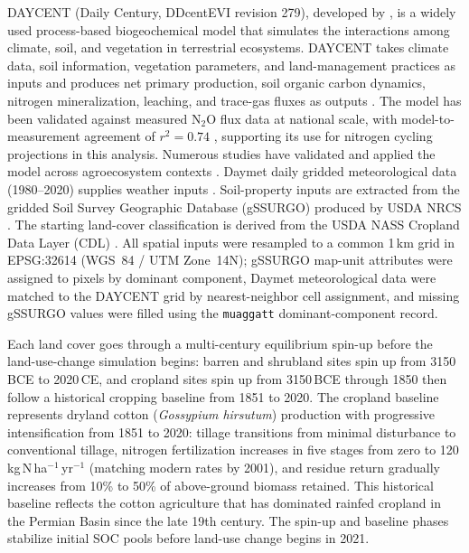 \documentclass[11pt]{article}
\begin{document}
DAYCENT (Daily Century, DDcentEVI revision 279), developed by \citet{Parton1998DAYCENT}, is a widely used process-based biogeochemical model that simulates the interactions among climate, soil, and vegetation in terrestrial ecosystems. DAYCENT takes climate data, soil information, vegetation parameters, and land-management practices as inputs and produces net primary production, soil organic carbon dynamics, nitrogen mineralization, leaching, and trace-gas fluxes as outputs \citep{Parton1998DAYCENT,DelGrosso2005Placeholder,DelGrosso2006NationalScale}. The model has been validated against measured N$_2$O flux data at national scale, with model-to-measurement agreement of $r^2 = 0.74$ \citep{DelGrosso2005Placeholder}, supporting its use for nitrogen cycling projections in this analysis. Numerous studies have validated and applied the model across agroecosystem contexts \citep{Davis2010Comparative,Jarecki2020Placeholder,Laub2024Placeholder}. Daymet daily gridded meteorological data (1980--2020) supplies weather inputs \citep{Thornton2022Daymet}. Soil-property inputs are extracted from the gridded Soil Survey Geographic Database (gSSURGO) produced by USDA NRCS \citep{NRCSgSSURGOPlaceholder}. The starting land-cover classification is derived from the USDA NASS Cropland Data Layer (CDL) \citep{NASCDLPlaceholder}. All spatial inputs were resampled to a common 1\,km grid in EPSG:32614 (WGS~84 / UTM Zone~14N); gSSURGO map-unit attributes were assigned to pixels by dominant component, Daymet meteorological data were matched to the DAYCENT grid by nearest-neighbor cell assignment, and missing gSSURGO values were filled using the \texttt{muaggatt} dominant-component record.

Each land cover goes through a multi-century equilibrium spin-up before the land-use-change simulation begins: barren and shrubland sites spin up from 3150\,BCE to 2020\,CE, and cropland sites spin up from 3150\,BCE through 1850 then follow a historical cropping baseline from 1851 to 2020. The cropland baseline represents dryland cotton (\textit{Gossypium hirsutum}) production with progressive intensification from 1851 to 2020: tillage transitions from minimal disturbance to conventional tillage, nitrogen fertilization increases in five stages from zero to 120\,kg\,N\,ha$^{-1}$\,yr$^{-1}$ (matching modern rates by 2001), and residue return gradually increases from 10\% to 50\% of above-ground biomass retained. This historical baseline reflects the cotton agriculture that has dominated rainfed cropland in the Permian Basin since the late 19th century. The spin-up and baseline phases stabilize initial SOC pools before land-use change begins in 2021.
\end{document}
